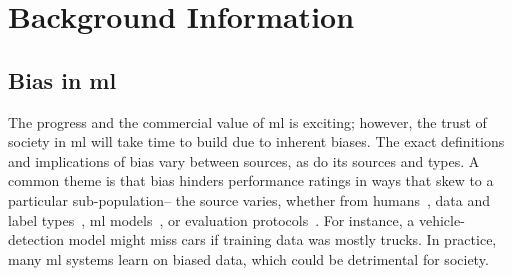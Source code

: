 \section{Background Information}
    \subsection{Bias in \gls{ml}}
        The progress and the commercial value of \gls{ml} is exciting; however, the trust of society in \gls{ml} will take time to build due to inherent biases. The exact definitions and implications of bias vary between sources, as do its sources and types. A common theme is that bias hinders performance ratings in ways that skew to a particular sub-population-- the source varies, whether from humans~\cite{windmann1998subconscious}, data and label types~\cite{tommasi2017deeper}, \gls{ml} models~\cite{amini2019uncovering, kim2019learning}, or evaluation protocols~\cite{stock2018convnets}. For instance, a vehicle-detection model might miss cars if training data was mostly trucks. In practice, many \gls{ml} systems learn on biased data, which could be detrimental for society. 


